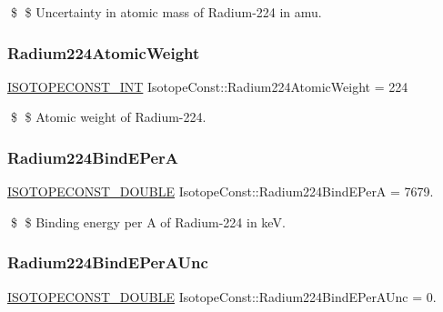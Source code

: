 \$ \$ Uncertainty in atomic mass of Radium-\/224 in amu. \mbox{\label{group___isotope_const-_radium-_ra224_ga1565daf5de46c38f2c73bb2723e1af36}} 
\subsubsection{\texorpdfstring{Radium224\+Atomic\+Weight}{Radium224AtomicWeight}}
{\footnotesize\ttfamily \mbox{\hyperlink{group___isotope_const-_macros_ga5f18360b3e99483a35c32d789e62621c}{I\+S\+O\+T\+O\+P\+E\+C\+O\+N\+S\+T\+\_\+\+I\+NT}} Isotope\+Const\+::\+Radium224\+Atomic\+Weight = 224}

\$ \$ Atomic weight of Radium-\/224. \mbox{\label{group___isotope_const-_radium-_ra224_ga1343ba1d7e0288d0e578c72b4bdce20c}} 
\subsubsection{\texorpdfstring{Radium224\+Bind\+E\+PerA}{Radium224BindEPerA}}
{\footnotesize\ttfamily \mbox{\hyperlink{group___isotope_const-_macros_ga8f45a7272ce02c0b4c65c44636ed719a}{I\+S\+O\+T\+O\+P\+E\+C\+O\+N\+S\+T\+\_\+\+D\+O\+U\+B\+LE}} Isotope\+Const\+::\+Radium224\+Bind\+E\+PerA = 7679.}

\$ \$ Binding energy per A of Radium-\/224 in keV. \mbox{\label{group___isotope_const-_radium-_ra224_ga50900ad58ebe256db12ecc5488095ef2}} 
\subsubsection{\texorpdfstring{Radium224\+Bind\+E\+Per\+A\+Unc}{Radium224BindEPerAUnc}}
{\footnotesize\ttfamily \mbox{\hyperlink{group___isotope_const-_macros_ga8f45a7272ce02c0b4c65c44636ed719a}{I\+S\+O\+T\+O\+P\+E\+C\+O\+N\+S\+T\+\_\+\+D\+O\+U\+B\+LE}} Isotope\+Const\+::\+Radium224\+Bind\+E\+Per\+A\+Unc = 0.}

